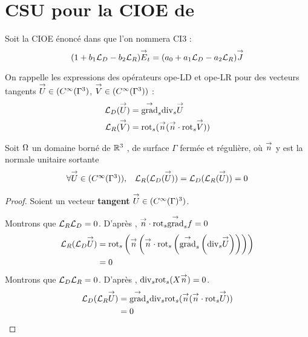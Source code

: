 \section{CSU pour la CIOE de \cite{aubakirov_electromagnetic_2014}}

  Soit la CIOE énoncé dans \cite{aubakirov_electromagnetic_2014} que l'on nommera CI3 :
  \begin{equation}
    \label{eq:unicite:ci3:ci3}
    ( 1 + b_1 \LD - b_2 \LR)\vE_t = (a_0 + a_1 \LD - a_2 \LR ) \vJ
  \end{equation}

  On rappelle les expressions des opérateurs \gls{ope-LD} et \gls{ope-LR} pour des vecteurs tangents \(\vect U \in (C^\infty(\Gamma^ 3)\), \( \vect V \in (C^\infty(\Gamma^3))\) :
  \begin{align*}
    \LD(\vect U) &= \tgrads \tdivs \vect U\\
    \LR(\vect V) &= \trots( \vn ( \vn \cdot \trots \vect V))\\
  \end{align*}
  \begin{prop}
    Soit \(\OO\) un domaine borné de \(\RR^3\) , de surface \(\Gamma\) fermée et régulière, où \(\vect n\) y est la normale unitaire
    sortante
    \begin{equation}
      \begin{matrix}
        \forall \vect U \in (C^\infty(\Gamma^3)) ,& \LR(\LD(\vect U)) = \LD(\LR(\vect U)) = 0
      \end{matrix}
    \end{equation}
  \end{prop}
  \begin{proof}

    Soient un vecteur \textbf{tangent} \(\vect U \in (C^\infty(\Gamma)^3)\).

    Montrons que \(\LR\LD = 0\). D’après \cite[p.~1029, A3.42]{bladel_electromagnetic_2007}, \(\vn \cdot \trots\tgrads f = 0\)
    \begin{align*}
      \LR(\LD \vect U)  &= \trots \left(\vn \left(\vn \cdot \trots \left( \tgrads \left(\tdivs \vect U\right)\right)\right)\right) \\
      &= 0
    \end{align*}
    Montrons que \(\LD\LR = 0\). D’après \cite[p.~1029, A3.43]{bladel_electromagnetic_2007}, \(\tdivs \trots (X\vn) = 0\).
    \begin{align*}
      \LD(\LR \vect U) &= \tgrads \tdivs \trots (\vn (\vn \cdot \trots \vect U)) \\
      &= 0
    \end{align*}
  \end{proof}

